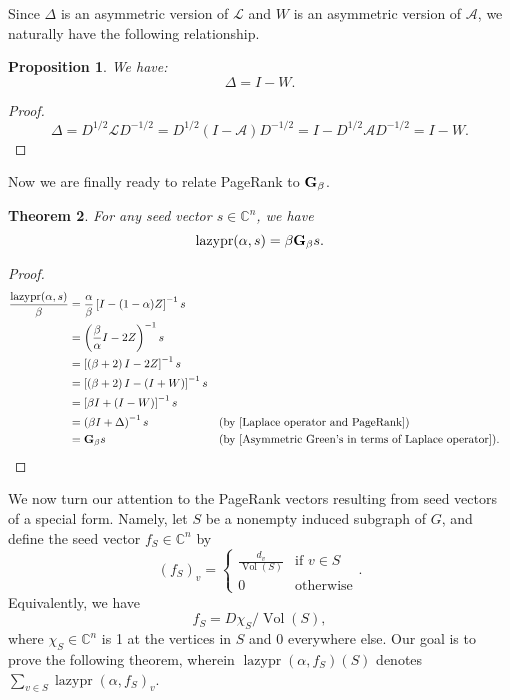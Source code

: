 \documentclass[12pt]{article}
\newtheorem{thm}{Theorem}
\newtheorem{prop}[thm]{Proposition}
\theoremstyle{definition}
\newcommand{\C}{\mathbb C}
\DeclareMathOperator{\lazypr}{lazypr}
\DeclareMathOperator{\vol}{Vol}
\newcommand{\lap}{\mathcal{L}}
\newcommand{\normadj}{\mathcal{A}}
\newcommand{\laplace}{\Delta}
\newcommand{\asymgreen}{\normalfont{\textbf{G}}}
\begin{document}
Since $\laplace$ is an asymmetric version of $\lap$ and $W$ is an asymmetric version of $\normadj$, we naturally have the following relationship.

\begin{prop}\label{Laplace operator and PageRank}
We have: $$\laplace = I - W.$$
\end{prop}
\begin{proof}
$$
\laplace 
= D^{1/2} \lap D^{-1/2} 
= D^{1/2} (I - \normadj) D^{-1/2}
= I - D^{1/2} \normadj D^{-1/2}
= I - W.
$$
\end{proof}

Now we are finally ready to relate PageRank to $\asymgreen_\beta$.

\begin{thm}
For any seed vector $s \in \C^n$, we have
$$
\lazypr (\alpha, s) = \beta \asymgreen_\beta s.
$$
\end{thm}
\begin{proof}
\begin{align*}
\frac{\lazypr (\alpha, s)}{\beta} 
&= \frac{\alpha}{\beta} \left[ I - (1 - \alpha)Z \right]^{-1} s \\ 
&= \left( \frac{\beta}{\alpha} I - 2 Z \right)^{-1} s \\
&= \left[ \left( \beta + 2 \right) I - 2 Z \right]^{-1} s \\
&= \left[ \left( \beta + 2 \right) I - (I + W) \right]^{-1} s \\
&= \left[ \beta I + (I - W) \right]^{-1} s \\
&= \left( \beta I + \laplace \right)^{-1} s &&\text{(by \cref{Laplace operator and PageRank})} \\
&= \asymgreen_\beta s &&\text{(by \cref{Asymmetric Green's in terms of Laplace operator})}.
\end{align*}
\end{proof}

We now turn our attention to the PageRank vectors resulting from seed vectors of a special form. Namely, let $S$ be a nonempty induced subgraph of $G$, and define the seed vector $f_S \in \C^n$ by
$$
(f_S)_v =
\begin{cases}
\frac{d_v}{\vol(S)} &\text{if } v \in S \\
0 &\text{otherwise}
\end{cases}.
$$
Equivalently, we have $$f_S = D \chi_S / \vol (S),$$
where $\chi_S \in \C^n$ is 1 at the vertices in $S$ and 0 everywhere else. Our goal is to prove the following theorem, wherein $\lazypr(\alpha, f_S)(S)$ denotes $\sum_{v \in S} \lazypr(\alpha, f_S)_v$.
\end{document}

